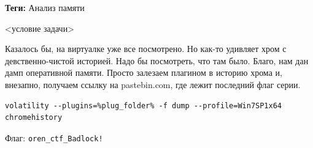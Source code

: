 \documentclass[idxtotoc,hyperref,openany,oneside]{files/forensics} %
\begin{document}
\textbf{Теги:} Анализ памяти\vspace{\baselineskip}

\begin{tcolorbox}
<условие задачи>
\end{tcolorbox}

Казалось бы, на виртуалке уже все посмотрено. Но как-то удивляет хром с девственно-чистой историей. Надо бы посмотреть, что там было. Благо, нам дан дамп оперативной памяти. Просто залезаем плагином в историю хрома и, внезапно, получаем ссылку на pastebin.com, где лежит последний флаг серии.

\begin{verbatim}
volatility --plugins=%plug_folder% -f dump --profile=Win7SP1x64 chromehistory
\end{verbatim}

Флаг: \verb|oren_ctf_Badlock!|

\end{document}
